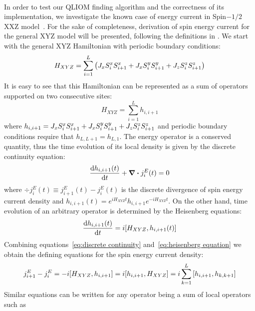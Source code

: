 \paragraph{}In order to test our QLIOM finding algorithm and the correctness of its implementation, we investigate the known case of
energy current in Spin\(-1/2\) XXZ model~\autocite*{Mierzejewski2015Approx}. For the sake of completeness, derivation of
spin energy current for the general XYZ model will be presented, following the definitions in \textcite{Zotos1997}.
We start with the general XYZ Hamiltonian with periodic boundary conditions:
\begin{equation}
    H_{XYZ} = \sum_{i=1}^L  \left( J_{x} S^{x}_{i}S^{x}_{i+1} + J_{x} S^{y}_{i}S^{y}_{i+1} + J_{z} S^{z}_{i}S^{z}_{i+1} \right)
\end{equation}
It is easy to see that this Hamiltonian can be represented as a sum of operators supported on two consecutive sites:
\begin{equation}
    H_{XYZ} = \sum_{i=1}^L h_{i,i+1}
\end{equation}
where \(h_{i,i+1} = J_{x} S^{x}_{i}S^{x}_{i+1} + J_{x} S^{y}_{i}S^{y}_{i+1} + J_{z} S^{z}_{i}S^{z}_{i+1} \) and periodic boundary conditions
require that \(h_{L,L+1} = h_{L,1}\). The energy operator is a conserved quantity, thus the time evolution of its local density
is given by the discrete continuity equation:
\begin{equation}
    \dv{h_{i,i+1}(t)}{t} + \div{j_{i}^{E}(t)} = 0 
    \label{eq:discrete continuity}
\end{equation}
where \(\div{j_{i}^E(t)} \equiv j_{i+1}^E(t) - j_{i}^E(t)\) is the discrete divergence of spin energy current density and \(h_{i,i+1}(t) = e^{i H_{XYZ}t} h_{i,i+1} e^{-i H_{XYZ} t}\).
On the other hand, time evolution of an arbitrary operator is determined
by the Heisenberg equations:
\begin{equation}
    \dv{h_{i,i+1}(t)}{t} = i \comm{H_{XYZ}}{h_{i,i+1}(t)}
    \label{eq:heisenberg equation}
\end{equation}
Combining equations~\eqref{eq:discrete continuity} and~\eqref{eq:heisenberg equation} we obtain the defining equations for
the spin energy current density:
\begin{equation}
    j_{i+1}^E - j_{i}^E = - i \comm{H_{XYZ}}{h_{i,i+1}} = i \comm{h_{i,i+1}}{H_{XYZ}} = i \sum_{k=1}^L \comm{h_{i,i+1}}{h_{k,k+1}} 
    \label{eq:energy current defining equation}
\end{equation}
Similar equations can be written for any operator being a sum of local operators such as
